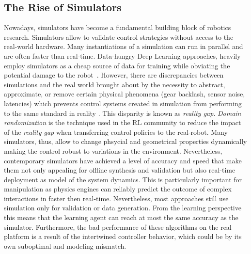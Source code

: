 \subsection{The Rise of Simulators}
Nowadays, simulators have become a fundamental building block of robotics research. Simulators allow to validate control strategies without access to the real-world hardware. Many instantiations of a simulation can run in parallel and are often faster than real-time. Data-hungry Deep Learning approaches, heavily employ simulators as a cheap source of data for training while obviating the potential damage to the robot~\cite{liang_gpu-accelerated_2018}. However, there are discrepancies between simulations and the real world brought about by the necessity to abstract, approximate, or remove certain physical phenomena (gear backlash, sensor noise, latencies) which prevents control systems created in simulation from performing to the same standard in reality \cite{collins_benchmarking_2020}. This disparity is known as \emph{reality gap}. \emph{Domain randomization} is the technique used in the RL community to reduce the impact of the \emph{reality gap} when transferring control policies to the real-robot. Many simulators, thus, allow to change phsycial and geometrical properties dynamically making the control robust to variations in the environment. Nevertheless, contemporary simulators have achieved a level of accuracy and speed that make them not only appealing for offline synthesis and validation but also real-time deployment as model of the system dynamics. This is particularly important for manipulation as physics engines can reliably predict the outcome of complex interactions in faster then real-time. Nevertheless, most approaches still use simulation only for validation or data generation. From the learning perspective this means that the learning agent can reach at most the same accuracy as the simulator. Furthermore, the bad performance of these algorithms on the real platform is a result of the intertwined controller behavior, which could be by its own suboptimal and modeling mismatch.   

